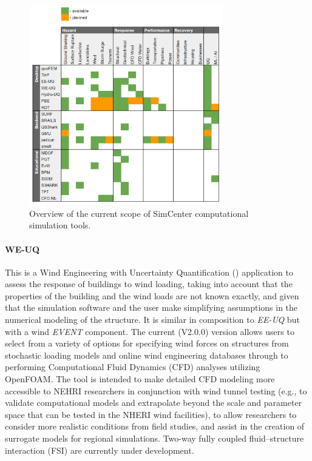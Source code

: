 \begin{figure}[htb]
    \centering
    \includegraphics[width=0.75\textwidth, angle = 0]{Figures/tool_overview.pdf}
    \caption{Overview of the current scope of SimCenter computational simulation tools.}
    \label{fig:intro_tool_overview}
\end{figure}

\paragraph{WE-UQ} This is a Wind Engineering with Uncertainty Quantification () application to assess the response of buildings to wind loading, taking into account that the properties of the building and the wind loads are not known exactly, and given that the simulation software and the user make simplifying assumptions in the numerical modeling of the structure. It is similar in composition to \emph{EE-UQ} but with a wind \emph{EVENT} component.  The current (V2.0.0) version allows users to select from a variety of options for specifying wind forces on structures from stochastic loading models and online wind engineering databases through to performing Computational Fluid Dynamics (CFD) analyses utilizing OpenFOAM. The tool is intended to make detailed CFD modeling more accessible to NEHRI researchers in conjunction with wind tunnel testing (e.g., to validate computational models and extrapolate beyond the scale and parameter space that can be tested in the NHERI wind facilities), to allow researchers to consider more realistic conditions from field studies, and assist in the creation of surrogate models for regional simulations. Two-way fully coupled fluid--structure interaction (FSI) are currently under development.

